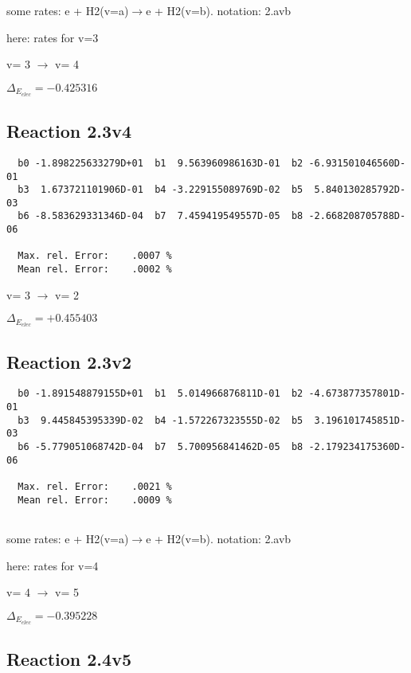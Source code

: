 \documentclass[12pt]{article}
\begin{document}
\newpage
some rates: e + H2(v=a)$\rightarrow$e + H2(v=b). notation: 2.avb

here: rates for v=3

  v=  3 $\rightarrow$ v= 4

$\Delta_{E_{elec}}=-0.425316$

\subsection{
Reaction 2.3v4
}


\begin{small}\begin{verbatim}
  b0 -1.898225633279D+01  b1  9.563960986163D-01  b2 -6.931501046560D-01
  b3  1.673721101906D-01  b4 -3.229155089769D-02  b5  5.840130285792D-03
  b6 -8.583629331346D-04  b7  7.459419549557D-05  b8 -2.668208705788D-06

  Max. rel. Error:    .0007 %
  Mean rel. Error:    .0002 %

\end{verbatim}\end{small}

  v=  3 $\rightarrow$ v= 2

$\Delta_{E_{elec}}=+0.455403$

\subsection{
Reaction 2.3v2
}


\begin{small}\begin{verbatim}
  b0 -1.891548879155D+01  b1  5.014966876811D-01  b2 -4.673877357801D-01
  b3  9.445845395339D-02  b4 -1.572267323555D-02  b5  3.196101745851D-03
  b6 -5.779051068742D-04  b7  5.700956841462D-05  b8 -2.179234175360D-06

  Max. rel. Error:    .0021 %
  Mean rel. Error:    .0009 %


\end{verbatim}\end{small}

\newpage
some rates: e + H2(v=a)$\rightarrow$e + H2(v=b). notation: 2.avb

here: rates for v=4

  v=  4 $\rightarrow$ v= 5

$\Delta_{E_{elec}}=-0.395228$

\subsection{
Reaction 2.4v5
}
\end{document}
